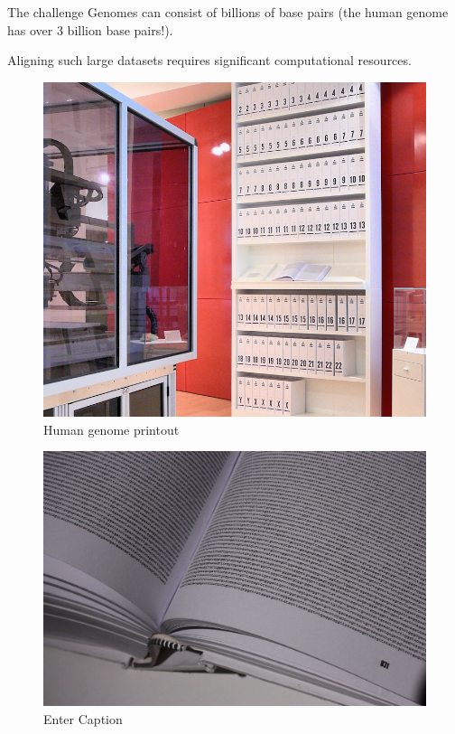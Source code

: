     \begin{frame}{The challenge}
        Genomes can consist of billions of base pairs (the human genome has over 3 billion base pairs!).
        
        Aligning such large datasets requires significant computational resources.

        \vspace{10pt}

    \begin{minipage}{0.49\linewidth}
        \begin{figure}
                \includegraphics[width=0.8\linewidth]{human_genome_printout.png}
                \caption{Human genome printout}
            \end{figure}
    \end{minipage}
    \begin{minipage}{0.49\linewidth}
        \begin{figure}
            \includegraphics[width=1\linewidth]{human_genome_book.JPG}
            \caption{Enter Caption}
        \end{figure}
    \end{minipage}
    \end{frame}





